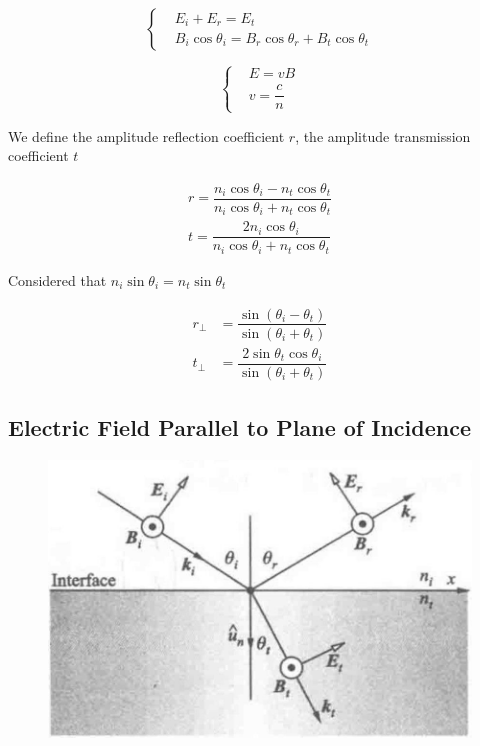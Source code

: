 \begin{equation*}
 \left\{
  \begin{aligned}
    & E_i + E_r = E_t \\
    & B_i \cos \theta_i = B_r \cos \theta_r + B_t \cos \theta_t
  \end{aligned}
  \right.
\end{equation*}

\begin{equation*}
  \left\{
  \begin{aligned}
    & E = v B \\
    & v = \dfrac{c}{n}
  \end{aligned}
  \right.
\end{equation*}

We define the amplitude reflection coefficient $r$, the amplitude transmission coefficient $t$

\begin{equation*}
  \begin{aligned}
    r = \dfrac{n_i \cos \theta_i - n_t \cos \theta_t}{n_i \cos \theta_i + n_t \cos \theta_t} \\
    t = \dfrac{2 n_i \cos \theta_i}{n_i \cos \theta_i + n_t \cos \theta_t} 
  \end{aligned}
\end{equation*}

Considered that $n_i \sin \theta_i = n_t \sin \theta_t$

\begin{equation*}
  \begin{aligned}
    r_{\perp} &= \dfrac{\sin \left( \theta_i - \theta_t \right)}{\sin \left( \theta_i + \theta_t \right)} \\
    t_{\perp} &= \dfrac{2 \sin \theta_t \cos \theta_i}{\sin \left( \theta_i + \theta_t \right)} 
  \end{aligned}
\end{equation*}

\subsection{Electric Field Parallel to Plane of Incidence}

\begin{figure}[H]
  \centering
  \includegraphics[width=0.5\linewidth]{figures/Fresnel-parallel}
  \label{fig:}
\end{figure}

